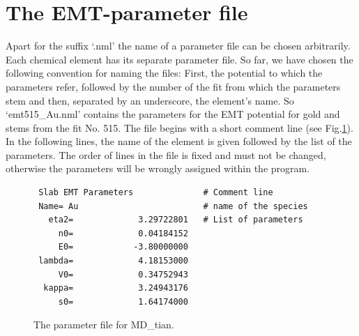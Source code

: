 \documentclass[twoside, 11pt, titlepage, captions=nooneline, a4paper, headsepline]{scrbook}%
\newcommand{\9}{\mathrm}
\newcommand{\0}{\,\mathrm}
\begin{document}
\section{The EMT-parameter file}
Apart for the suffix `.nml' the name of a parameter file can be chosen arbitrarily. Each chemical element has its separate parameter file. So far, we have chosen the following convention for naming the files: First, the potential to which the parameters refer, followed by the number of the fit from which the parameters stem and then, separated by an underscore, the element's name. So `emt515\_Au.nml' contains the parameters for the EMT potential for gold and stems from the fit No. 515. The file begins with a short comment line (see Fig.\ref{Fig:nmlfile}). In the following lines, the name of the element is given followed by the list of the parameters. The order of lines in the file is fixed and must not be changed, otherwise the parameters will be wrongly assigned within the program.
\begin{figure}[t!]
\begin{verbatim}
 Slab EMT Parameters              # Comment line
 Name= Au                         # name of the species
   eta2=             3.29722801   # List of parameters
     n0=             0.04184152
     E0=            -3.80000000
 lambda=             4.18153000
     V0=             0.34752943
  kappa=             3.24943176
     s0=             1.64174000
\end{verbatim}
\caption{\label{Fig:nmlfile}The parameter file for MD\_tian.}
\end{figure}
\end{document}
